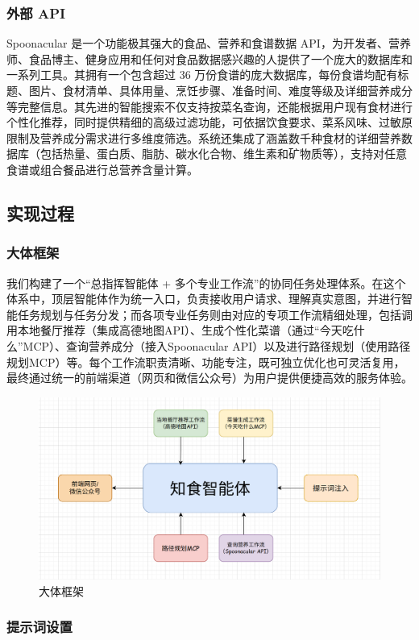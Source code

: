 \documentclass[a4paper,UTF8]{ctexart}
\begin{document}
\subsubsection{外部 API}
Spoonacular 是一个功能极其强大的食品、营养和食谱数据 API，为开发者、营养师、食品博主、健身应用和任何对食品数据感兴趣的人提供了一个庞大的数据库和一系列工具。其拥有一个包含超过 36 万份食谱的庞大数据库，每份食谱均配有标题、图片、食材清单、具体用量、烹饪步骤、准备时间、难度等级及详细营养成分等完整信息。其先进的智能搜索不仅支持按菜名查询，还能根据用户现有食材进行个性化推荐，同时提供精细的高级过滤功能，可依据饮食要求、菜系风味、过敏原限制及营养成分需求进行多维度筛选。系统还集成了涵盖数千种食材的详细营养数据库（包括热量、蛋白质、脂肪、碳水化合物、维生素和矿物质等），支持对任意食谱或组合餐品进行总营养含量计算。

\subsection{实现过程}
\subsubsection{大体框架}
我们构建了一个“总指挥智能体 + 多个专业工作流”的协同任务处理体系。在这个体系中，顶层智能体作为统一入口，负责接收用户请求、理解真实意图，并进行智能任务规划与任务分发；而各项专业任务则由对应的专项工作流精细处理，包括调用本地餐厅推荐（集成高德地图API）、生成个性化菜谱（通过“今天吃什么”MCP）、查询营养成分（接入Spoonacular API）以及进行路径规划（使用路径规划MCP）等。每个工作流职责清晰、功能专注，既可独立优化也可灵活复用，最终通过统一的前端渠道（网页和微信公众号）为用户提供便捷高效的服务体验。
\begin{figure}[H]
    \centering
    \includegraphics[width=0.8\linewidth]{0.png}
    \caption{大体框架}
    \label{fig:diet_recommend}
\end{figure}

\subsubsection{提示词设置}
\end{document}
